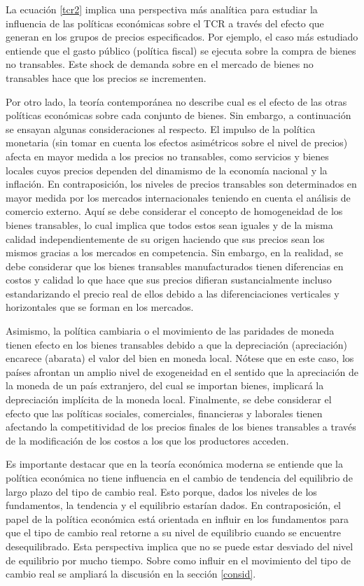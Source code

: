\documentclass[12pt,letterpaper]{article}
\begin{document}
La ecuación \ref{tcr2} implica una perspectiva más analítica para estudiar la influencia de las políticas económicas sobre el TCR a través del efecto que generan en los grupos de precios especificados. Por ejemplo, el caso más estudiado entiende que el gasto público (política fiscal) se ejecuta sobre la compra de bienes no transables. Este shock de demanda sobre en el mercado de bienes no transables hace que los precios se incrementen. 

Por otro lado, la teoría contemporánea no describe cual es el efecto de las otras políticas económicas sobre cada conjunto de bienes. Sin embargo, a continuación se ensayan algunas consideraciones al respecto. El impulso de la política monetaria (sin tomar en cuenta los efectos asimétricos sobre el nivel de precios) afecta en mayor medida a los precios no transables, como servicios y bienes locales cuyos precios dependen del dinamismo de la economía nacional y la inflación. En contraposición, los niveles de precios transables son determinados en mayor medida por los mercados internacionales teniendo en cuenta el análisis de comercio externo. Aquí se debe considerar el concepto de homogeneidad de los bienes transables, lo cual implica que todos estos sean iguales y de la misma calidad independientemente de su origen haciendo que sus precios sean los mismos gracias a los mercados en competencia. Sin embargo, en la realidad, se debe considerar que los bienes transables manufacturados tienen diferencias en costos y calidad lo que hace que sus precios difieran sustancialmente incluso estandarizando el precio real de ellos debido a las diferenciaciones verticales y horizontales que se forman en los mercados. 

Asimismo, la política cambiaria o el movimiento de las paridades de moneda tienen efecto en los bienes transables debido a que la depreciación (apreciación) encarece (abarata) el valor del bien en moneda local. Nótese que en este caso, los países afrontan un amplio nivel de exogeneidad en el sentido que la apreciación de la moneda de un país extranjero, del cual se importan bienes, implicará la depreciación implícita de la moneda local. Finalmente, se debe considerar el efecto que las políticas sociales, comerciales, financieras y laborales tienen afectando la competitividad de los precios finales de los bienes transables a través de la modificación de los costos a los que los productores acceden. 

Es importante destacar que en la teoría económica moderna se entiende que la política económica no tiene influencia en el cambio de tendencia del equilibrio de largo plazo del tipo de cambio real. Esto porque, dados los niveles de los fundamentos, la tendencia y el equilibrio estarían dados. En contraposición, el papel de la política económica está orientada en influir en los fundamentos para que el tipo de cambio real retorne a su nivel de equilibrio cuando se encuentre desequilibrado. Esta perspectiva implica que no se puede estar desviado del nivel de equilibrio por mucho tiempo. Sobre como influir en el movimiento del tipo de cambio real se ampliará la discusión en la sección \ref{consid}.
\end{document}

